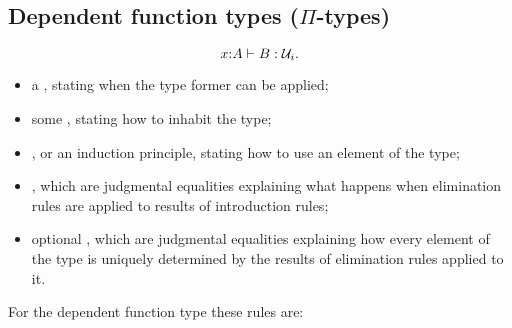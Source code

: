 \documentclass[hott-all.tex]{subfiles}
\begin{document}
\subsection{Dependent function types (\texorpdfstring{$\Pi$}{Π}-types)}
%
%
%
\begin{equation*}
  x \mathord{:} A \vdash B : \mathcal{U}_i.
\end{equation*}
\begin{itemize}
\item a , stating when the type former can be applied;
\item some , stating how to inhabit the type;
\item {}, or an induction principle, stating how to use an
  element of the type;
\item {}, which are judgmental equalities explaining what happens when elimination rules are applied to results of introduction rules;
\item optional , which are judgmental equalities explaining how every element of the type is uniquely determined by the results of elimination rules applied to it.
\end{itemize}
%
For the dependent function type these rules are:
%
\end{document}

